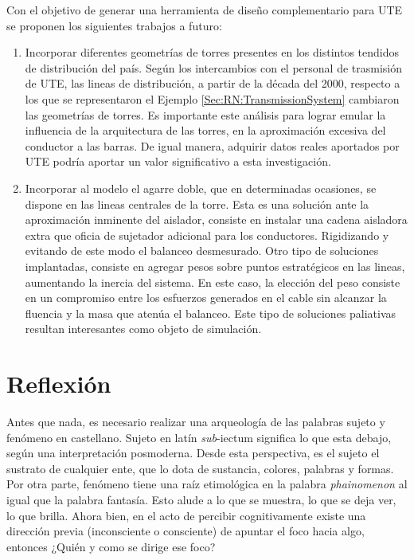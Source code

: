 Con el objetivo de generar una herramienta de diseño complementario para UTE se proponen los siguientes trabajos a futuro:

\begin{enumerate}
	\item Incorporar diferentes geometrías de torres presentes en los distintos tendidos de distribución del país. Según los intercambios con el personal de trasmisión de UTE, las lineas de distribución, a partir de la década del 2000, respecto a los que se representaron el Ejemplo \ref{Sec:RN:TransmissionSystem} cambiaron las geometrías de torres. Es importante este análisis para lograr emular la influencia de la arquitectura de las torres, en la aproximación excesiva del conductor a las barras. De igual manera, adquirir datos reales aportados por UTE podría aportar un valor significativo a esta investigación.
	\item Incorporar al modelo el agarre doble, que en determinadas ocasiones, se dispone en las lineas centrales de la torre. Esta es una solución ante la aproximación inminente del aislador, consiste en instalar una cadena aisladora extra que oficia de sujetador adicional para los conductores. Rigidizando y evitando de este modo el balanceo desmesurado. Otro tipo de soluciones implantadas, consiste en agregar pesos sobre puntos estratégicos en las lineas, aumentando la inercia del sistema. En este caso, la elección del peso consiste en un compromiso entre los esfuerzos generados en el cable sin alcanzar la fluencia y la masa que atenúa el balanceo. Este tipo de soluciones paliativas resultan interesantes como objeto de simulación.	
\end{enumerate}


\section{Reflexión}


Antes que nada, es necesario realizar una arqueología de las palabras sujeto y fenómeno en castellano. Sujeto en latín \emph{sub}-{iectum} significa lo que esta debajo, según una interpretación posmoderna. Desde esta perspectiva, es el sujeto el sustrato de cualquier ente, que lo dota de sustancia, colores, palabras y formas. Por otra parte, fenómeno tiene una raíz etimológica en la palabra \emph{phainomenon} al igual que la palabra fantasía. Esto alude a lo que se muestra, lo que se deja ver, lo que brilla. Ahora bien, en el acto de percibir cognitivamente existe una dirección previa (inconsciente o consciente) de apuntar el foco hacia algo, entonces ¿Quién y como se dirige ese foco?


